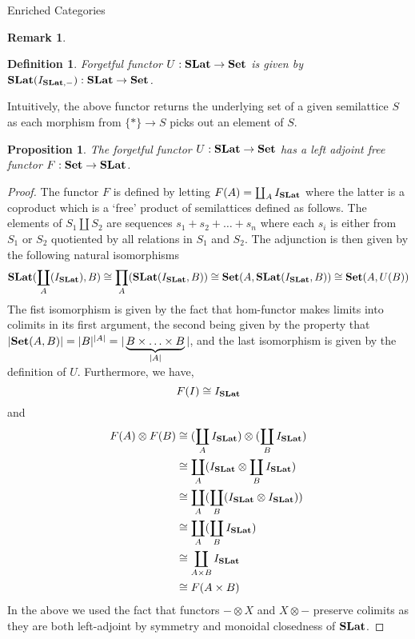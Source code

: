 \documentclass[acmsmall, screen, nonacm]{acmart}
\newtheorem{definition}[theorem]{Definition}
\newtheorem{proposition}[theorem]{Proposition}
\newtheorem{remark}[theorem]{Remark}
\begin{document}
\begin{section}{Enriched Categories}
\begin{remark}
\end{remark}

\begin{definition}
Forgetful functor $U : \mathbf{SLat} \to \mathbf{Set}$ is given by $\mathbf{SLat}(I_{\mathbf{SLat}, -}) : \mathbf{SLat} \to \mathbf{Set}$.
\end{definition}

Intuitively, the above functor returns the underlying set of a given semilattice $S$ as each morphism from $\{*\} \to S$ picks out an element of $S$.

\begin{proposition}
  The forgetful functor $U : \mathbf{SLat} \to \mathbf{Set}$ has a left adjoint free functor $F : \mathbf{Set} \to \mathbf{SLat}$.
\end{proposition}
\begin{proof}
  The functor $F$ is defined by letting $F(A) = \coprod_{A} I_{\mathbf{SLat}}$ where the latter is a coproduct which is a `free' product of semilattices defined as follows.
  The elements of $S_{1} \coprod S_{2}$ are sequences $s_{1} + s_{2} + \ldots + s_{n}$ where each $s_{i}$ is either from $S_{1}$ or $S_{2}$ quotiented by all relations in $S_{1}$ and $S_{2}$.
  The adjunction is then given by the following natural isomorphisms
  \[
  \mathbf{SLat}(\coprod_{A}(I_{\mathbf{SLat}}), B) \cong \prod_{A}(\mathbf{SLat}(I_{\mathbf{SLat}}, B)) \cong \mathbf{Set}(A,\mathbf{SLat}(I_{\mathbf{SLat}}, B)) \cong \mathbf{Set}(A, U(B))
  \]
  The fist isomorphism is given by the fact that hom-functor makes limits into colimits in its first argument, the second being given by the property that $|\mathbf{Set}(A,B)| = |B|^{|A|} = |\underbrace{B \times \ldots \times B}_{|A|}|$, and the last isomorphism is given by the definition of $U$.
  Furthermore, we have, 
  \[
  F(I) \cong I_{\mathbf{SLat}}
  \]
  and 
  \begin{align*}
  F(A) \otimes F(B) &\cong (\coprod_{A} I_{\mathbf{SLat}}) \otimes (\coprod_{B} I_{\mathbf{SLat}})\\
        &\cong \coprod_{A} (I_{\mathbf{SLat}} \otimes \coprod_{B} I_{\mathbf{SLat}})\\
        &\cong \coprod_{A} (\coprod_{B} (I_{\mathbf{SLat}} \otimes I_{\mathbf{SLat}}))\\
        &\cong \coprod_{A} (\coprod_{B} I_{\mathbf{SLat}})\\
        &\cong \coprod_{A \times B} I_{\mathbf{SLat}}\\
        &\cong F(A \times B)
  \end{align*}
In the above we used the fact that functors $- \otimes X$ and $X \otimes -$ preserve colimits as they are both left-adjoint by symmetry and monoidal closedness of $\mathbf{SLat}$.
\end{proof}


\end{section}
\end{document}
